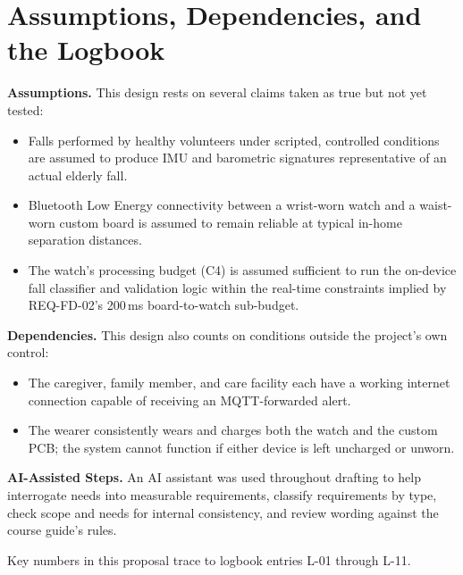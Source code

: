 \documentclass[conference,onecolumn]{IEEEtran}
\begin{document}


\section{Assumptions, Dependencies, and the Logbook}
\label{sec:assumptions}

\textbf{Assumptions.} This design rests on several claims taken as true but not yet tested:
\begin{itemize}[leftmargin=*, itemsep=2pt, topsep=2pt, partopsep=0pt]
\item Falls performed by healthy volunteers under scripted, controlled conditions are assumed to produce IMU and barometric signatures representative of an actual elderly fall.
\item Bluetooth Low Energy connectivity between a wrist-worn watch and a waist-worn custom board is assumed to remain reliable at typical in-home separation distances.
\item The watch's processing budget (C4) is assumed sufficient to run the on-device fall classifier and validation logic within the real-time constraints implied by REQ-FD-02's 200\,ms board-to-watch sub-budget.
\end{itemize}

\textbf{Dependencies.} This design also counts on conditions outside the project's own control:
\begin{itemize}[leftmargin=*, itemsep=2pt, topsep=2pt, partopsep=0pt]
\item The caregiver, family member, and care facility each have a working internet connection capable of receiving an MQTT-forwarded alert.
\item The wearer consistently wears and charges both the watch and the custom PCB; the system cannot function if either device is left uncharged or unworn.
\end{itemize}

\textbf{AI-Assisted Steps.} An AI assistant was used throughout drafting to help interrogate needs into measurable requirements, classify requirements by type, check scope and needs for internal consistency, and review wording against the course guide's rules.

Key numbers in this proposal trace to logbook entries L-01 through L-11.
\end{document}
